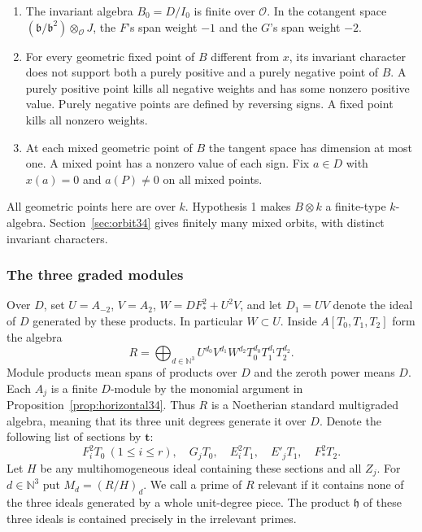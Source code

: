 \documentclass[a4paper,11pt]{article}
\theoremstyle{definition}
\theoremstyle{remark}
\numberwithin{equation}{section}
\newcommand{\OO}{\mathcal O}
\begin{document}
\begin{enumerate}\setlength{\itemsep}{1pt}
\item The invariant algebra \(B_0=D/I_0\) is finite over \(\OO\). In the cotangent space \((\mathfrak b/\mathfrak b^2)\otimes_{\OO}J\), the \(F\)'s span weight \(-1\) and the \(G\)'s span weight \(-2\).
\item For every geometric fixed point of \(B\) different from \(x\), its invariant character does not support both a purely positive and a purely negative point of \(B\). A purely positive point kills all negative weights and has some nonzero positive value. Purely negative points are defined by reversing signs. A fixed point kills all nonzero weights.
\item At each mixed geometric point of \(B\) the tangent space has dimension at most one. A mixed point has a nonzero value of each sign. Fix \(a\in D\) with \(x(a)=0\) and \(a(P)\ne0\) on all mixed points.
\end{enumerate}
All geometric points here are over \(k\). Hypothesis 1 makes \(B\otimes k\) a finite-type \(k\)-algebra. Section~\ref{sec:orbit34} gives finitely many mixed orbits, with distinct invariant characters.

\subsubsection{The three graded modules}\label{nav:IV-06}
Over \(D\), set \(U=A_{-2}\), \(V=A_2\), \(W= D F_*^2+U^2V\), and let \(D_1=UV\) denote the ideal of \(D\) generated by these products. In particular \(W\subset U\). Inside \(A[T_0,T_1,T_2]\) form the algebra
\[
 R=\bigoplus_{d\in\mathbb N^3}
 U^{d_0}V^{d_1}W^{d_2}T_0^{d_0}T_1^{d_1}T_2^{d_2}.
\]
Module products mean spans of products over \(D\) and the zeroth power means \(D\). Each \(A_j\) is a finite \(D\)-module by the monomial argument in Proposition~\ref{prop:horizontal34}. Thus \(R\) is a Noetherian standard multigraded algebra, meaning that its three unit degrees generate it over \(D\). Denote the following list of sections by \(\mathbf t\):
\begin{equation}
 F_i^2T_0\ (1\le i\le r),\quad G_jT_0,\quad E_i^2T_1,\quad
 E'_jT_1,\quad F_*^2T_2 .                                      \label{eq:sections35}
\end{equation}
Let \(H\) be any multihomogeneous ideal containing these sections and all \(Z_j\). For \(d\in\mathbb N^3\) put \(M_d=(R/H)_d\). We call a prime of \(R\) relevant if it contains none of the three ideals generated by a whole unit-degree piece. The product \(\mathfrak h\) of these three ideals is contained precisely in the irrelevant primes.
\end{document}
